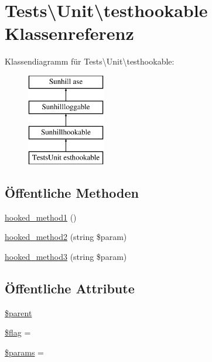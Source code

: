 \hypertarget{classTests_1_1Unit_1_1testhookable}{}\section{Tests\textbackslash{}Unit\textbackslash{}testhookable Klassenreferenz}
\label{classTests_1_1Unit_1_1testhookable}
Klassendiagramm für Tests\textbackslash{}Unit\textbackslash{}testhookable\+:\begin{figure}[H]
\begin{center}
\leavevmode
\includegraphics[height=4.000000cm]{db/de9/classTests_1_1Unit_1_1testhookable}
\end{center}
\end{figure}
\subsection*{Öffentliche Methoden}
\begin{DoxyCompactItemize}
\item 
\hyperlink{classTests_1_1Unit_1_1testhookable_a0df246f32367611e1a73e5420dd252ec}{hooked\+\_\+method1} ()
\item 
\hyperlink{classTests_1_1Unit_1_1testhookable_af8ff7ddc61601e37b2b97d69f74d68a5}{hooked\+\_\+method2} (string \$param)
\item 
\hyperlink{classTests_1_1Unit_1_1testhookable_a50303f09382c34f9075a436712e4b17d}{hooked\+\_\+method3} (string \$param)
\end{DoxyCompactItemize}
\subsection*{Öffentliche Attribute}
\begin{DoxyCompactItemize}
\item 
\hyperlink{classTests_1_1Unit_1_1testhookable_a8962ecf35260af2717a4dfcce6e68ea1}{\$parent}
\item 
\hyperlink{classTests_1_1Unit_1_1testhookable_ae842d7ddb0609a7a9ccf6697a1231ce9}{\$flag} = \textquotesingle{}\textquotesingle{}
\item 
\hyperlink{classTests_1_1Unit_1_1testhookable_a3d76a1902fa228b3431be4b414fba3cd}{\$params} =\textquotesingle{}\textquotesingle{}
\end{DoxyCompactItemize}
